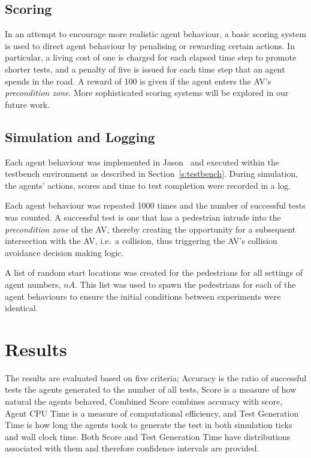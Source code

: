 \documentclass[letterpaper, 10 pt, journal, twoside]{IEEEtran}
\begin{document}
\subsection{Scoring}

In an attempt to encourage more realistic agent behaviour, a basic scoring system is used to direct agent behaviour by penalising or rewarding certain actions. In particular, a living cost of one is charged for each elapsed time step to promote shorter tests, and a penalty of five is issued for each time step that  an agent spends in the road. A reward of 100 is given if the agent enters the AV's \textit{precondition zone}. More sophisticated scoring systems will be explored in our future work. 




\subsection{Simulation and Logging}

Each agent behaviour was implemented in Jason~\cite{bordini2005jason} and executed within the testbench environment as described in Section~\ref{s:testbench}.
%
During simulation, the agents' actions, scores and time to test completion were recorded in a log.

Each agent behaviour was repeated 1000 times and the number of successful tests was counted. A successful test is one that has a pedestrian intrude into the \textit{precondition zone} of the AV, thereby creating the opportunity for a subsequent intersection with the AV, i.e.\ a collision, thus triggering the AV's collision avoidance decision making logic.

%
A list of random start locations was created for the pedestrians for all settings of agent numbers, $nA$. This list was used to spawn the pedestrians for each of the agent behaviours to ensure the initial conditions between experiments were identical. 

\section{Results}\label{s:results}
The results are evaluated based on five criteria; Accuracy is the ratio of successful tests the agents generated to the number of all tests, Score is a measure of how natural the agents behaved, Combined Score combines accuracy with score, Agent CPU Time is a measure of computational efficiency, and Test Generation Time is how long the agents took to generate the test in both simulation ticks and wall clock time. Both Score and Test Generation Time have distributions associated with them and therefore confidence intervals are provided.
\end{document}
